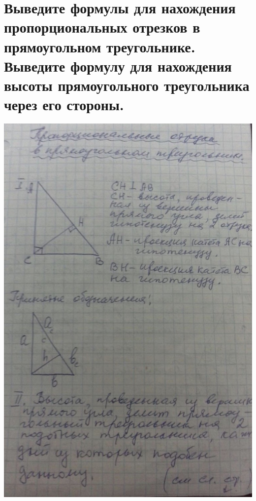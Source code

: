 \documentclass[12pt, letterpaper]{article}
\begin{document}
\section {Выведите формулы для нахождения пропорциональных отрезков в прямоугольном треугольнике. Выведите формулу для нахождения высоты прямоугольного треугольника через его стороны.}
\includegraphics[scale=0.3]{solve19.jpg} \\
\end{document}

